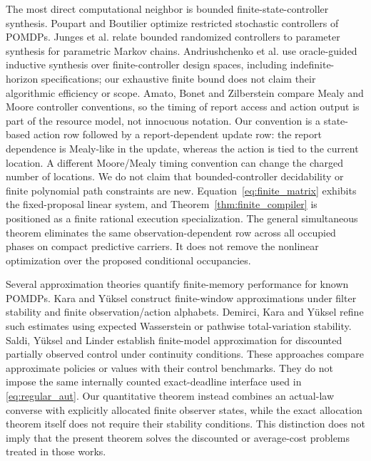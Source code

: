 The most direct computational neighbor is bounded finite-state-controller synthesis. Poupart and Boutilier\cite{poupart} optimize restricted stochastic controllers of POMDPs. Junges et al.\cite{junges} relate bounded randomized controllers to parameter synthesis for parametric Markov chains. Andriushchenko et al.\cite{andriushchenko} use oracle-guided inductive synthesis over finite-controller design spaces, including indefinite-horizon specifications; our exhaustive finite bound does not claim their algorithmic efficiency or scope. Amato, Bonet and Zilberstein\cite{amato} compare Mealy and Moore controller conventions, so the timing of report access and action output is part of the resource model, not innocuous notation. Our convention is a state-based action row followed by a report-dependent update row: the report dependence is Mealy-like in the update, whereas the action is tied to the current location. A different Moore/Mealy timing convention can change the charged number of locations. We do not claim that bounded-controller decidability or finite polynomial path constraints are new. Equation~\eqref{eq:finite_matrix} exhibits the fixed-proposal linear system, and Theorem~\ref{thm:finite_compiler} is positioned as a finite rational execution specialization. The general simultaneous theorem eliminates the same observation-dependent row across all occupied phases on compact predictive carriers. It does not remove the nonlinear optimization over the proposed conditional occupancies.

Several approximation theories quantify finite-memory performance for known POMDPs. Kara and Y\"uksel\cite{kara} construct finite-window approximations under filter stability and finite observation/action alphabets. Demirci, Kara and Y\"uksel\cite{refined} refine such estimates using expected Wasserstein or pathwise total-variation stability. Saldi, Y\"uksel and Linder\cite{saldi} establish finite-model approximation for discounted partially observed control under continuity conditions. These approaches compare approximate policies or values with their control benchmarks. They do not impose the same internally counted exact-deadline interface used in \eqref{eq:regular_aut}. Our quantitative theorem instead combines an actual-law converse with explicitly allocated finite observer states, while the exact allocation theorem itself does not require their stability conditions. This distinction does not imply that the present theorem solves the discounted or average-cost problems treated in those works.

